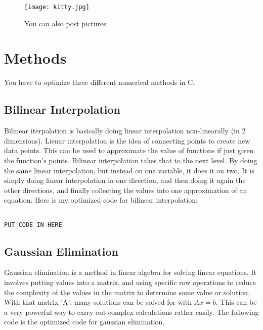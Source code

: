 \documentclass{article}
\begin{document}
\begin{figure}[!htbp]
\begin{center}
\texttt{[image: kitty.jpg]}
\end{center}
\caption{You can also post pictures}\label{kitty}
\end{figure}

\section{Methods}
You have to optimize three different numerical methods in C.
\subsection{Bilinear Interpolation}
Bilinear iterpolation is basically doing linear interpolation non-linearally (in 2 dimensions). Lienar interpolation is the idea of connecting points to create new data points. This can be used to approximate the value of functions if just given the function's points. Bilinear interpolation takes that to the next level. By doing the same linear interpolation, but instead on one variable, it does it on two. It is simply doing linear interpolation in one direction, and then doing it again the other directions, and finally collecting the values into one approximation of an equation. Here is my optimized code for bilinear interpolation:

\begin{verbatim}

PUT CODE IN HERE

\end{verbatim}

\subsection{Gaussian Elimination}
Gaussian elimination is a method in linear algebra for solving linear equations. It involves putting values into a matrix, and using specific row operations to reduce the complexity of the values in the matrix to determine some value or solution. With that matrix 'A', many solutions can be solved for with $ Ax=b $. This can be a very powerful way to carry out complex calculations rather easily. The following code is the optimized code for gaussian elimination.
\end{document}
